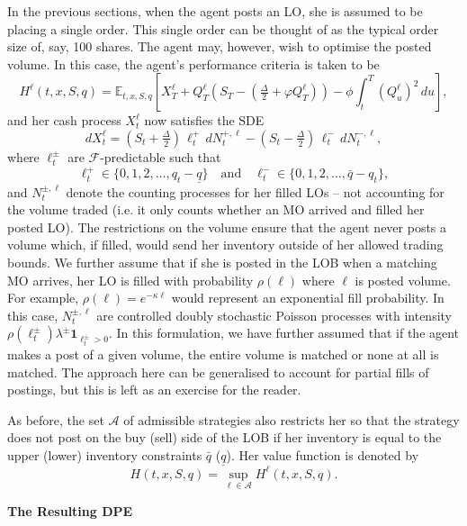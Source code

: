 \documentclass[11pt, a4paper]{book}
\newcommand{\E}{\mathbb{E}}
\newcommand{\Ind}{\mathbf{1}}
\begin{document}
	In the previous sections, when the agent posts an LO, she is assumed to be placing a single order. This single order can be thought of as the typical order size of, say, 100 shares. The agent may, however, wish to optimise the posted volume. In this case, the agent's performance criteria is taken to be
	\[
	H^\ell(t, x, S, q) = \E_{t,x,S,q} \left[ X^\ell_T + Q^\ell_T (S_T - (\tfrac{\Delta}{2} + \varphi Q^\ell_T)) - \phi \int_t^T (Q^\ell_u)^2 \, du \right],
	\]
	and her cash process $X^\ell_t$ now satisfies the SDE
	\[
	dX^\ell_t = (S_t + \tfrac{\Delta}{2}) \, \ell^+_t \, dN^{+, \ell}_t - (S_t - \tfrac{\Delta}{2}) \, \ell^-_t \, dN^{-, \ell}_t,
	\]
	where $\ell^\pm_t$ are $\mathcal{F}$-predictable such that
	\[
	\ell^+_t \in \{0, 1, 2, \dots, q_t - \underline{q} \} \quad \text{and} \quad \ell^-_t \in \{0, 1, 2, \dots, \bar{q} - q_t \},
	\]
	and $N^{\pm, \ell}_t$ denote the counting processes for her filled LOs – not accounting for the volume traded (i.e. it only counts whether an MO arrived and filled her posted LO). The restrictions on the volume ensure that the agent never posts a volume which, if filled, would send her inventory outside of her allowed trading bounds. We further assume that if she is posted in the LOB when a matching MO arrives, her LO is filled with probability $\rho(\ell)$ where $\ell$ is posted volume. For example, $\rho(\ell) = e^{-\kappa \ell}$ would represent an exponential fill probability. In this case, $N^{\pm, \ell}_t$ are controlled doubly stochastic Poisson processes with intensity $\rho(\ell_t^\pm)\lambda^\pm \Ind_{\ell_t^\pm > 0}$. In this formulation, we have further assumed that if the agent makes a post of a given volume, the entire volume is matched or none at all is matched. The approach here can be generalised to account for partial fills of postings, but this is left as an exercise for the reader.
	
	As before, the set $\mathcal{A}$ of admissible strategies also restricts her so that the strategy does not post on the buy (sell) side of the LOB if her inventory is equal to the upper (lower) inventory constraints $\bar{q}$ ($\underline{q}$). Her value function is denoted by
	\[
	H(t, x, S, q) = \sup_{\ell \in \mathcal{A}} H^\ell(t, x, S, q).
	\]
	
	\textbf{The Resulting DPE}
	
\end{document}
